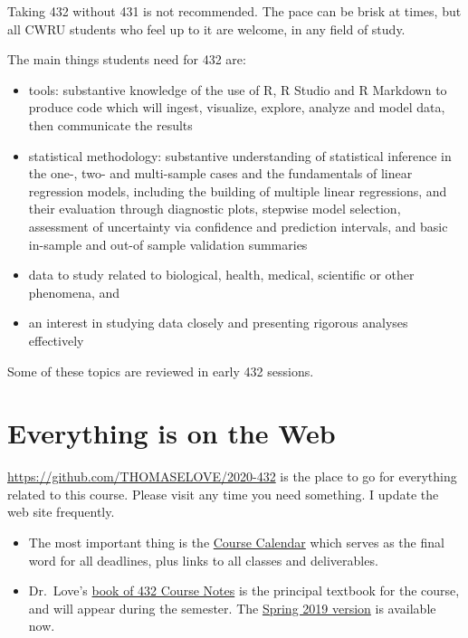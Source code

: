 \documentclass[
]{book}
\providecommand{\tightlist}{%
  \setlength{\itemsep}{0pt}\setlength{\parskip}{0pt}}
\begin{document}
Taking 432 without 431 is not recommended. The pace can be brisk at times, but all CWRU students who feel up to it are welcome, in any field of study.

The main things students need for 432 are:

\begin{itemize}
\tightlist
\item
  tools: substantive knowledge of the use of R, R Studio and R Markdown to produce code which will ingest, visualize, explore, analyze and model data, then communicate the results
\item
  statistical methodology: substantive understanding of statistical inference in the one-, two- and multi-sample cases and the fundamentals of linear regression models, including the building of multiple linear regressions, and their evaluation through diagnostic plots, stepwise model selection, assessment of uncertainty via confidence and prediction intervals, and basic in-sample and out-of sample validation summaries
\item
  data to study related to biological, health, medical, scientific or other phenomena, and
\item
  an interest in studying data closely and presenting rigorous analyses effectively
\end{itemize}

Some of these topics are reviewed in early 432 sessions.

\hypertarget{everything-is-on-the-web}{%
\section{Everything is on the Web}\label{everything-is-on-the-web}}

\url{https://github.com/THOMASELOVE/2020-432} is the place to go for everything related to this course. Please visit any time you need something. I update the web site frequently.

\begin{itemize}
\tightlist
\item
  The most important thing is the \href{https://github.com/THOMASELOVE/2020-432/blob/master/calendar.md}{Course Calendar} which serves as the final word for all deadlines, plus links to all classes and deliverables.
\item
  Dr.~Love's \href{https://thomaselove.github.io/2020-432-book/}{book of 432 Course Notes} is the principal textbook for the course, and will appear during the semester. The \href{https://thomaselove.github.io/2019-432-book/}{Spring 2019 version} is available now.
\end{itemize}
\end{document}
